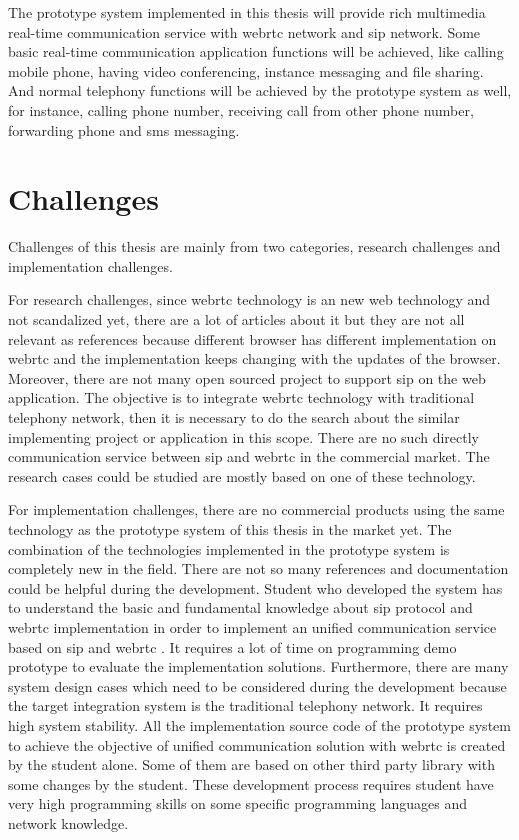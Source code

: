 \par The prototype system implemented in this thesis will provide rich multimedia real-time communication service with \gls{webrtc} network and \gls{sip} network. Some basic real-time communication application functions will be achieved, like calling mobile phone, having video conferencing, instance messaging and file sharing. And normal telephony functions will be achieved by the prototype system as well, for instance, calling phone number, receiving call from other phone number, forwarding phone and \gls{sms} messaging.

\section{Challenges}

\noindent Challenges of this thesis are mainly from two categories, research challenges and implementation challenges.

\par For research challenges, since \gls{webrtc} technology is an new web technology and not scandalized yet, there are a lot of articles about it but they are not all relevant as references because different browser has different implementation on \gls{webrtc} and the implementation keeps changing with the updates of the browser. Moreover, there are not many open sourced project to support \gls{sip} on the web application. The objective is to integrate \gls{webrtc} technology with traditional telephony network, then it is necessary to do the search about the similar implementing project or application in this scope. There are no such directly communication service between \gls{sip} and \gls{webrtc} in the commercial market. The research cases could be studied are mostly based on one of these technology.

\par For implementation challenges, there are no commercial products using the same technology as the prototype system of this thesis in the market yet. The combination of the technologies implemented in the prototype system is completely new in the field. There are not so many references and documentation could be helpful during the development. Student who developed the system has to understand the basic and fundamental knowledge about \gls{sip} protocol and \gls{webrtc} implementation in order to implement an unified communication service based on \gls{sip} and \gls{webrtc} . It requires a lot of time on programming demo prototype to evaluate the implementation solutions. Furthermore, there are many system design cases which need to be considered during the development because the target integration system is the traditional telephony network. It requires high system stability. All the implementation source code of the prototype system to achieve the objective of unified communication solution with \gls{webrtc} is created by the student alone. Some of them are based on other third party library with some changes by the student. These development process requires student have very high programming skills on some specific programming languages and network knowledge.

